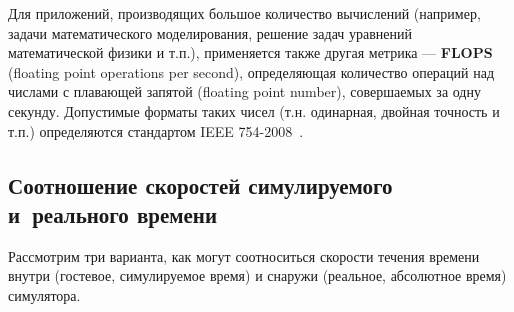 Для приложений, производящих большое количество вычислений (например, задачи математического моделирования, решение задач уравнений математической физики и т.п.), применяется также другая метрика --- \textbf{FLOPS} (\abbr floating point operations per second), определяющая количество операций над числами с плавающей запятой (\abbr floating point number), совершаемых за одну секунду. Допустимые форматы таких чисел (т.н. одинарная, двойная точность и т.п.) определяются стандартом IEEE 754-2008~\cite{ieee754}.

\subsection[Соотношение скоростей]{Соотношение скоростей симулируемого и~реального времени}

Рассмотрим три варианта, как могут соотноситься скорости течения времени внутри (гостевое, симулируемое время) и снаружи (реальное, абсолютное время) симулятора.

